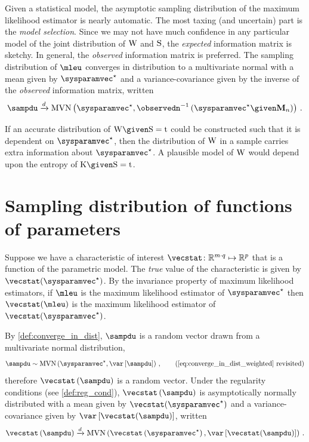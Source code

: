 \documentclass[../main.tex]{subfiles}
\begin{document}
Given a statistical model, the asymptotic sampling distribution of the maximum likelihood estimator is nearly automatic. The most taxing (and uncertain) part is the \emph{model selection}. Since we may not have much confidence in any particular model of the joint distribution of $\mathrm{W}$ and $\mathrm{S}$, the \emph{expected} information matrix is sketchy. In general, the \emph{observed} information matrix is preferred. The sampling distribution of $\mleu$ converges in distribution to a multivariate normal with a mean given by $\tparam\sysparamvec$ and a variance-covariance given by the inverse of the \emph{observed} information matrix, written
\begin{equation}
    \sampdu \xrightarrow{d} \mvn\left(\tparam\sysparamvec, \observedn^{-1}\left(\tparam\sysparamvec \given \mfs\right)\right)\,.
\end{equation}

If an accurate distribution of $\RV{W} \given \sv = \ti$ could be constructed such that it is dependent on $\tparam\sysparamvec$, then the distribution of $\mathrm{W}$ in a sample carries extra information about $\tparam\sysparamvec$. A plausible model of $\mathrm{W}$ would depend upon the entropy of $\RV{K} \given \sv = \ti$.






\chapter{Sampling distribution of functions of parameters}
\label{sec:app}
Suppose we have a characteristic of interest $\vecstat \colon \mathbb{R}^{m \cdot q} \mapsto \mathbb{R}^{p}$ that is a function of the parametric model.
The \emph{true} value of the characteristic is given by $\vecstat(\tparam\sysparamvec)$.
By the invariance property of maximum likelihood estimators, if $\mleu$ is the maximum likelihood estimator of $\tparam\sysparamvec$ then $\vecstat(\mleu)$ is the maximum likelihood estimator of $\vecstat(\tparam\sysparamvec)$.

By \cref{def:converge_in_dist}, $\sampdu$ is a random vector drawn from a multivariate normal distribution,
\begin{equation*}
\sampdu \sim \mvn\left(\tparam\sysparamvec, \var\left[\sampdu\right]\right)\,,
\tag{\text{\ref{eq:converge_in_dist_weighted} revisited}}
\end{equation*}
therefore $\vecstat\left(\sampdu\right)$ is a random vector. Under the regularity conditions (see \cref{def:reg_cond}), $\vecstat\left(\sampdu\right)$ is asymptotically normally distributed with a mean given by $\vecstat(\tparam\sysparamvec)$ and a variance-covariance given by $\var\left[\vecstat(\sampdu)\right]$, written
\begin{equation}
\vecstat\left(\sampdu\right) \xrightarrow{d} \mvn\left(\vecstat\left(\tparam\sysparamvec\right), \var\left[\vecstat(\sampdu)\right]\right)\,.
\end{equation}
\end{document}
